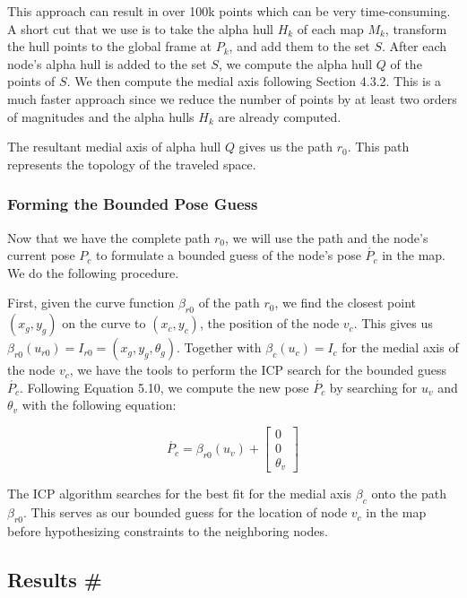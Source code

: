 This approach can result in over 100k points which can be very time-consuming. A short cut that we use is to take the alpha hull $H_k$ of each map $M_k$, transform the hull points to the global frame at $P_k$, and add them to the set $S$. After each node's alpha hull is added to the set $S$, we compute the alpha hull $Q$ of the points of $S$. We then compute the medial axis following Section 4.3.2. This is a much faster approach since we reduce the number of points by at least two orders of magnitudes and the alpha hulls $H_k$ are already computed.

The resultant medial axis of alpha hull $Q$ gives us the path $r_0$. This path represents the topology of the traveled space.

\subsubsection{Forming the Bounded Pose Guess}
\label{formingtheboundedposeguess}

Now that we have the complete path $r_0$, we will use the path and the node's current pose $P_c$ to formulate a bounded guess of the node's pose $\acute{P_c}$ in the map. We do the following procedure.

First, given the curve function $\beta_{r0}$ of the path $r_0$, we find the closest point $(x_g,y_g)$ on the curve to $(x_c, y_c)$, the position of the node $v_c$. This gives us $\beta_{r0}(u_{r0}) = I_{r0} = (x_g,y_g,\theta_g)$. Together with $\beta_c(u_c) = I_c$ for the medial axis of the node $v_c$, we have the tools to perform the ICP search for the bounded guess $\acute{P_c}$. Following Equation 5.10, we compute the new pose $\acute{P_c}$ by searching for $u_v$ and $\theta_v$ with the following equation:


\begin{equation}
\acute{P_c} = \beta_{r0}(u_v) +
\begin{bmatrix}
0 \\
0 \\
\theta_v
\end{bmatrix}
\end{equation}


The ICP algorithm searches for the best fit for the medial axis $\beta_c$ onto the path $\beta_{r0}$. This serves as our bounded guess for the location of node $v_c$ in the map before hypothesizing constraints to the neighboring nodes.

\subsection{Results \#}
\label{naive:results}

